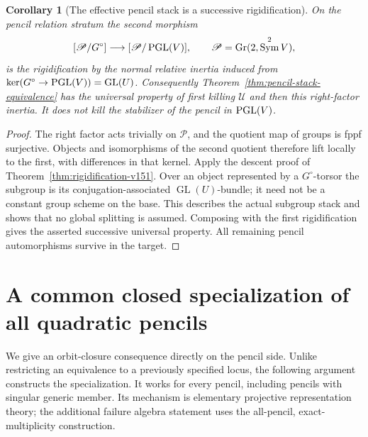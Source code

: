 \documentclass[11pt,reqno]{amsart}
\numberwithin{equation}{section}
\newtheorem{corollary}[theorem]{Corollary}
\theoremstyle{definition}\newtheorem{definition}[theorem]{Definition}
\theoremstyle{remark}\newtheorem{remark}[theorem]{Remark}
\DeclareMathOperator{\Sym}{Sym}\DeclareMathOperator{\Gr}{Gr}
\begin{document}
\begin{corollary}[The effective pencil stack is a successive rigidification]
\label{cor:two-rigidifications-v151}
On the pencil relation stratum the second morphism
\[
 [\mathscr P/G^\circ]\longrightarrow[\mathscr P/\PGL(V)],
                     \qquad \mathscr P=\Gr(2,\Sym^2V),
\]
is the rigidification by the normal relative inertia induced from
\(\ker(G^\circ\to\operatorname{PGL}(V))=\operatorname{GL}(U)\).
Consequently Theorem~\ref{thm:pencil-stack-equivalence} has the
universal property of first killing \(\mathscr U\) and then this
right-factor inertia.  It does not kill the stabilizer of the pencil
in \(\operatorname{PGL}(V)\).
\end{corollary}
\begin{proof}
The right factor acts trivially on \(\mathscr P\), and the quotient
map of groups is fppf surjective.  Objects and isomorphisms of the
second quotient therefore lift locally to the first, with differences
in that kernel.  Apply the descent proof of
Theorem~\ref{thm:rigidification-v151}.  Over an object represented by
a \(G^\circ\)-torsor the subgroup is its conjugation-associated
\(\operatorname{GL}(U)\)-bundle; it need not be a constant group
scheme on the base.  This describes the actual subgroup stack and
shows that no global splitting is assumed.  Composing with the first
rigidification gives the asserted successive universal property.
All remaining pencil automorphisms survive in the target.
\end{proof}

\section{A common closed specialization of all quadratic pencils}
\label{sec:closed-pencil-v151}

We give an orbit-closure consequence directly on the pencil side.
Unlike restricting an equivalence to a previously specified locus, the
following argument constructs the specialization.  It works for every
pencil, including pencils with singular generic member.  Its mechanism
is elementary projective representation theory; the additional failure
algebra statement uses the all-pencil, exact-multiplicity construction.
\end{document}
